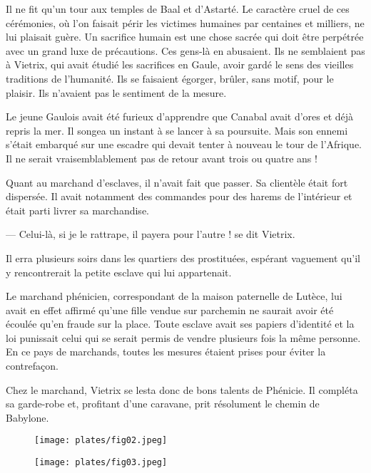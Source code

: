 \documentclass[a4paper, 11pt, oneside, polutonikogreek, french]{article}
\begin{document}
\bigskip
\centerline{\EightStarTaper}
\centerline{\EightStarTaper\EightStarTaper}
\bigskip

Il ne fit qu'un tour aux temples de Baal et d'Astarté. Le caractère cruel de ces cérémonies, où l'on faisait périr les victimes humaines par centaines et milliers, ne lui plaisait guère. Un sacrifice humain est une chose sacrée qui doit être perpétrée avec un grand luxe de précautions. Ces gens-là en abusaient. Ils ne semblaient pas à Vietrix, qui avait étudié les sacrifices en Gaule, avoir gardé le sens des vieilles traditions de l'humanité. Ils se faisaient égorger, brûler, sans motif, pour le plaisir. Ils n'avaient pas le sentiment de la mesure.

\bigskip
\centerline{\EightStarTaper}
\centerline{\EightStarTaper\EightStarTaper}
\bigskip

Le jeune Gaulois avait été furieux d'apprendre que Canabal avait d'ores et déjà repris la mer. Il songea un instant à se lancer à sa poursuite. Mais son ennemi s'était embarqué sur une escadre qui devait tenter à nouveau le tour de l'Afrique. Il ne serait vraisemblablement pas de retour avant trois ou quatre ans !

Quant au marchand d'esclaves, il n'avait fait que passer. Sa clientèle était fort dispersée. Il avait notamment des commandes pour des harems de l'intérieur et était parti livrer sa marchandise.

--- Celui-là, si je le rattrape, il payera pour l'autre ! se dit Vietrix.

Il erra plusieurs soirs dans les quartiers des prostituées, espérant vaguement qu'il y rencontrerait la petite esclave qui lui appartenait.

Le marchand phénicien, correspondant de la maison paternelle de Lutèce, lui avait en effet affirmé qu'une fille vendue sur parchemin ne saurait avoir été écoulée qu'en fraude sur la place. Toute esclave avait ses papiers d'identité et la loi punissait celui qui se serait permis de vendre plusieurs fois la même personne. En ce pays de marchands, toutes les mesures étaient prises pour éviter la contrefaçon.

Chez le marchand, Vietrix se lesta donc de bons talents de Phénicie. Il compléta sa garde-robe et, profitant d'une caravane, prit résolument le chemin de Babylone.

\begin{figure}[H]
\centering
\texttt{[image: plates/fig02.jpeg]}
\end{figure}
\clearpage
\begin{figure}[H]
\centering
\texttt{[image: plates/fig03.jpeg]}
\end{figure}
\end{document}

